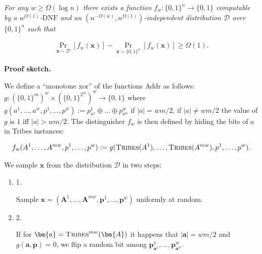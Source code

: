 \documentclass[10pt,a4paper]{article}
\begin{document}
\emph{For any $w\geq\Omega(\log n)$ there exists a function $f_{w}\colon\{0,1\}^{n}\to\{0,1\}$ computable by a
$w^{O(1)}$-$\mathrm{DNF}$ and an $(n^{-\Omega(w)},n^{\Omega(1)})$-independent distribution $\mathcal{D}$ over
$\{0,1\}^{n}$ such that}\par


\[\begin{gathered}
\Pr_{\bm{x}\sim\mathcal{D}}[f_{w}(\bm{x})]-\Pr_{\bm{x}\sim\{0,1\}^{n}}[f_{w}(\bm{x})]\geq\Omega(1).
\end{gathered}\]






\par\medskip\noindent\textbf{Proof sketch.}\par




We define a “monotone xor” of the functions Addr as follows:
$g\colon(\{0,1\}^{m})^{w}\times(\{0,1\}^{2^{m}})^{w}\to\{0,1\}$ where $g(a^{1},\dots,a^{w},p^{1},\dots,p^{w}):=p^{1}_{a^{1}}\oplus\dots\oplus p^{w}_{a^{w}}$ if $|a|=wm/2$, if $|a|\neq wm/2$ the value of $g$ is $1$ iff $|a|>wm/2$. The distinguisher $f_{w}$ is then defined by hiding the bits of $a$ in Tribes
instances:\par


\[\begin{gathered}
f_{w}(A^{1},\dots,A^{mw},p^{1},\dots,p^{w}):=g(\textsc{Tribes}(A^{1}),\dots,\textsc{Tribes}(A^{mw}),p^{1},\dots,p^{w}).
\end{gathered}\]




We sample $\bm{x}$ from the distribution
$\mathcal{D}$ in two steps:\par


\begin{enumerate}


\item[] 
1. 


Sample $\bm{x}=(\bm{A}^{1},\dots,\bm{A}^{mw},\bm{p}^{1},\dots,\bm{p}^{w})$ uniformly at
random.\par





\item[] 
2. 


If for $\bm{a}=\textsc{Tribes}^{mw}(\bm{A})$ it happens that $|\bm{a}|=wm/2$ and $g(\bm{a},\bm{p})=0$, we flip a random bit among $\bm{p}^{1}_{\bm{a}^{1}},\dots,\bm{p}^{w}_{\bm{a}^{w}}$.\par





\end{enumerate}
\end{document}
